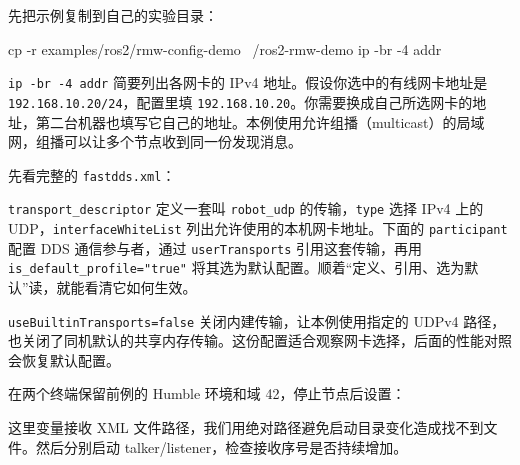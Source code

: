 \begin{example}[用两份配置选择通信网卡]
先把示例复制到自己的实验目录：
\par\medskip\noindent\begin{minipage}{\linewidth}
\begin{tbash}
cp -r examples/ros2/rmw-config-demo ~/ros2-rmw-demo
ip -br -4 addr
\end{tbash}
\end{minipage}\par\smallskip
\texttt{ip -br -4 addr} 简要列出各网卡的 IPv4 地址。假设你选中的有线网卡地址是 \texttt{192.168.10.20/24}，配置里填 \texttt{192.168.10.20}。你需要换成自己所选网卡的地址，第二台机器也填写它自己的地址。本例使用允许组播（multicast）的局域网，组播可以让多个节点收到同一份发现消息。

先看完整的 \texttt{fastdds.xml}：
\par\medskip\noindent\begin{minipage}{\linewidth}

\end{minipage}\par\smallskip
\texttt{transport\_descriptor} 定义一套叫 \texttt{robot\_udp} 的传输，\texttt{type} 选择 IPv4 上的 UDP，\nolinkurl{interfaceWhiteList} 列出允许使用的本机网卡地址。下面的 \texttt{participant} 配置 DDS 通信参与者，通过 \texttt{userTransports} 引用这套传输，再用 \nolinkurl{is_default_profile="true"} 将其选为默认配置。顺着“定义、引用、选为默认”读，就能看清它如何生效。

\texttt{useBuiltinTransports=false} 关闭内建传输，让本例使用指定的 UDPv4 路径，也关闭了同机默认的共享内存传输。这份配置适合观察网卡选择，后面的性能对照会恢复默认配置。

在两个终端保留前例的 Humble 环境和域 42，停止节点后设置：
\par\medskip\noindent\begin{minipage}{\linewidth}
\end{minipage}\par\smallskip
这里变量接收 XML 文件路径，我们用绝对路径避免启动目录变化造成找不到文件。然后分别启动 talker/listener，检查接收序号是否持续增加。


\end{example}

